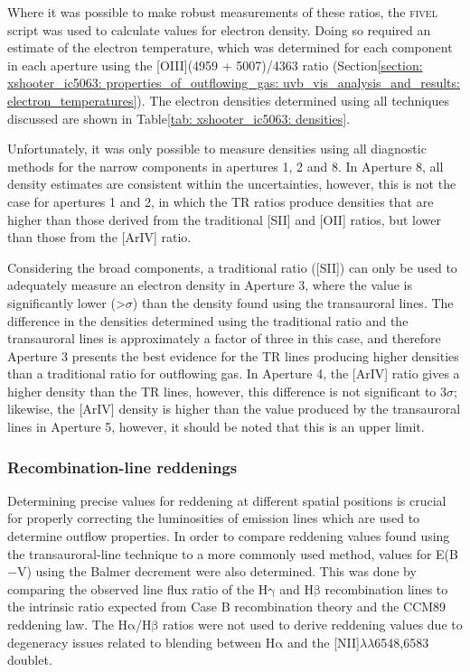 Where it was possible to make robust measurements of these ratios, the \textsc{fivel} script \citep{Shaw1995} was used to calculate values for electron density. Doing so required an estimate of the electron temperature, which was determined for each component in each aperture using the [OIII](4959 + 5007)/4363 ratio (Section\;\ref{section: xshooter_ic5063: properties_of_outflowing_gas: uvb_vis_analysis_and_results: electron_temperatures}). The electron densities determined using all techniques discussed are shown in Table\;\ref{tab: xshooter_ic5063: densities}. 

Unfortunately, it was only possible to measure densities using all diagnostic methods for the narrow components in apertures 1, 2 and 8. In Aperture 8, all density estimates are consistent within the uncertainties, however, this is not the case for apertures 1 and 2, in which the TR ratios produce densities that are higher than those derived from the traditional [SII] and [OII] ratios, but lower than those from the [ArIV] ratio.

Considering the broad components, a traditional ratio ([SII]) can only be used to adequately measure an electron density in Aperture 3, where the value is significantly lower (\mbox{\textgreater{}$\sigma$}) than the density found using the transauroral lines. The difference in the densities determined using the traditional ratio and the transauroral lines is approximately a factor of three in this case, and therefore Aperture 3 presents the best evidence for the TR lines producing higher densities than a traditional ratio for outflowing gas. In Aperture 4, the [ArIV] ratio gives a higher density than the TR lines, however, this difference is not significant to $3\sigma$; likewise, the [ArIV] density is higher than the value produced by the transauroral lines in Aperture 5, however, it should be noted that this is an upper limit.

\subsubsection{Recombination-line reddenings}
\label{section: xshooter_ic5063: properties_of_outflowing_gas: uvb_vis_analysis_and_results: balmer_decrement}

Determining precise values for reddening at different spatial positions is crucial for properly correcting the luminosities of emission lines which are used to determine outflow properties. In order to compare reddening values found using the transauroral-line technique to a more commonly used method, values for E(B$-$V) using the Balmer decrement were also determined. This was done by comparing the observed line flux ratio of the H$\mathrm{\gamma}$ and H$\mathrm{\beta}$ recombination lines to the intrinsic ratio expected from Case B recombination theory \citep{Osterbrock2006} and the CCM89 reddening law. The H$\mathrm{\alpha}$/H$\mathrm{\beta}$ ratios were not used to derive reddening values due to degeneracy issues related to blending between H$\mathrm{\alpha}$ and the [NII]$\lambda\lambda$6548,6583 doublet.

